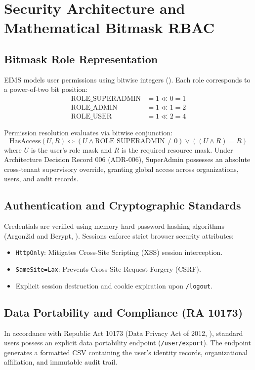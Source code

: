 \section{Security Architecture and Mathematical Bitmask RBAC}

\subsection{Bitmask Role Representation}
EIMS models user permissions using bitwise integers (\cite{sandhu1996role}). Each role corresponds to a power-of-two bit position:
\begin{align}
    \text{ROLE\_SUPERADMIN} &= 1 \ll 0 = 1 \\
    \text{ROLE\_ADMIN} &= 1 \ll 1 = 2 \\
    \text{ROLE\_USER} &= 1 \ll 2 = 4
\end{align}

Permission resolution evaluates via bitwise conjunction:
\begin{equation}
    \text{HasAccess}(U, R) \iff (U \land \text{ROLE\_SUPERADMIN} \neq 0) \lor ((U \land R) = R)
\end{equation}
where $U$ is the user's role mask and $R$ is the required resource mask. Under Architecture Decision Record 006 (ADR-006), SuperAdmin possesses an absolute cross-tenant supervisory override, granting global access across organizations, users, and audit records.

\subsection{Authentication and Cryptographic Standards}
Credentials are verified using memory-hard password hashing algorithms (Argon2id and Bcrypt, \cite{biryukov2016argon2}). Sessions enforce strict browser security attributes:
\begin{itemize}
    \item \texttt{HttpOnly}: Mitigates Cross-Site Scripting (XSS) session interception.
    \item \texttt{SameSite=Lax}: Prevents Cross-Site Request Forgery (CSRF).
    \item Explicit session destruction and cookie expiration upon \texttt{/logout}.
\end{itemize}

\subsection{Data Portability and Compliance (RA 10173)}
In accordance with Republic Act 10173 (Data Privacy Act of 2012, \cite{ra10173}), standard users possess an explicit data portability endpoint (\texttt{/user/export}). The endpoint generates a formatted CSV containing the user's identity records, organizational affiliation, and immutable audit trail.
